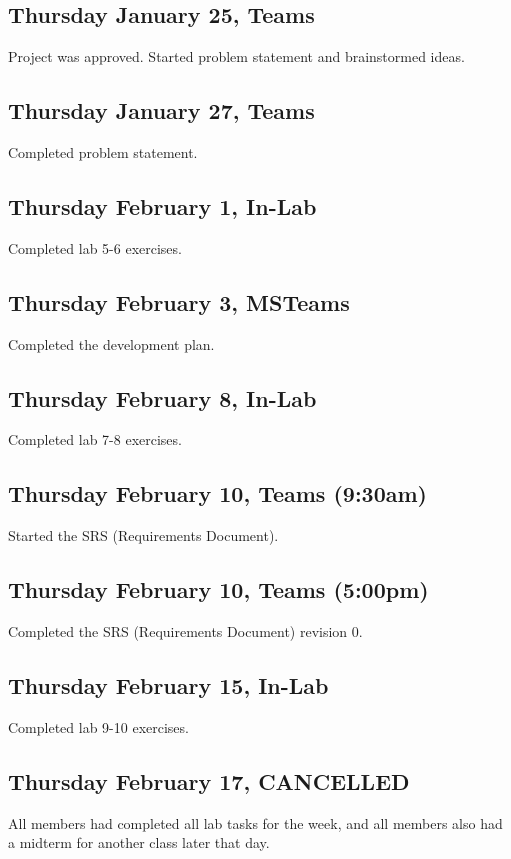 \documentclass{article}
\begin{document}
\subsection{Thursday January 25, Teams}
Project was approved. Started problem statement and brainstormed ideas.

\subsection{Thursday January 27, Teams}
Completed problem statement.

\subsection{Thursday February 1, In-Lab}
Completed lab 5-6 exercises.

\subsection{Thursday February 3, MSTeams}
Completed the development plan.

\subsection{Thursday February 8, In-Lab}
Completed lab 7-8 exercises.

\subsection{Thursday February 10, Teams (9:30am)}
Started the SRS (Requirements Document).

\subsection{Thursday February 10, Teams (5:00pm)}
Completed the SRS (Requirements Document) revision 0.

\subsection{Thursday February 15, In-Lab}
Completed lab 9-10 exercises.

\subsection{Thursday February 17, CANCELLED}
All members had completed all lab tasks for the week, and all members also had a midterm for another class later that day.
\end{document}
